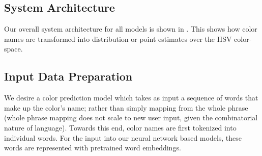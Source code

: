 \documentclass[]{clv3}
\begin{document}
\subsection{System Architecture}\label{sec:arch}
Our overall system architecture for all models is shown in .
This shows how color names are transformed into distribution or point estimates over the HSV color-space.

\subsection{Input Data Preparation}\label{sec:input-data-preparation}
We desire a color prediction model which takes as input a sequence of words that make up the color's name; rather than simply mapping from the whole phrase (whole phrase mapping does not scale to new user input, given the combinatorial nature of language).
Towards this end, color names are first tokenized into individual words.
For the input into our neural network based models, these words are represented with pretrained word embeddings.
\end{document}
